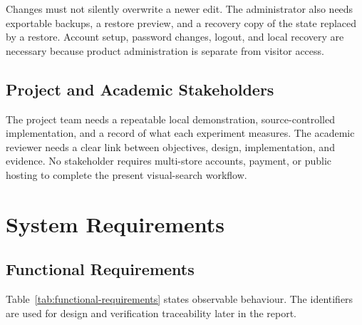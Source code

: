 Changes must not silently overwrite a newer edit. The administrator also needs
exportable backups, a restore preview, and a recovery copy of the state replaced
by a restore. Account setup, password changes, logout, and local recovery are
necessary because product administration is separate from visitor access.

\subsection{Project and Academic Stakeholders}
The project team needs a repeatable local demonstration, source-controlled
implementation, and a record of what each experiment measures. The academic
reviewer needs a clear link between objectives, design, implementation, and
evidence. No stakeholder requires multi-store accounts, payment, or public
hosting to complete the present visual-search workflow.

\section{System Requirements}
\subsection{Functional Requirements}
Table~\ref{tab:functional-requirements} states observable behaviour. The identifiers
are used for design and verification traceability later in the report.

